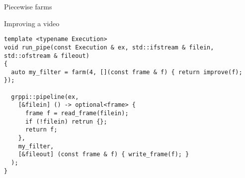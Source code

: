 \begin{frame}[t,fragile]{Piecewise farms}
\begin{block}{Improving a video}
\begin{lstlisting}
template <typename Execution>
void run_pipe(const Execution & ex, std::ifstream & filein, std::ofstream & fileout)
{
  auto my_filter = farm(4, [](const frame & f) { return improve(f); });

  grppi::pipeline(ex,
    [&filein] () -> optional<frame> {
      frame f = read_frame(filein);
      if (!filein) retrun {};
      return f;
    },
    my_filter,
    [&fileout] (const frame & f) { write_frame(f); }
  );
}
\end{lstlisting}
\end{block}
\end{frame}
